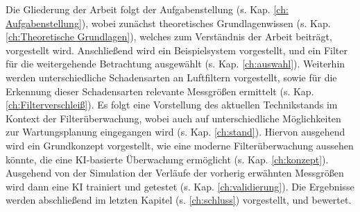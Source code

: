     Die Gliederung der Arbeit folgt der Aufgabenstellung (s. Kap. \ref{ch: Aufgabenstellung}), wobei zunächst theoretisches Grundlagenwissen (s. Kap. \ref{ch:Theoretische Grundlagen}), welches zum Verständnis der Arbeit beiträgt, vorgestellt wird. Anschließend wird ein Beispielsystem vorgestellt, und ein Filter für die weitergehende Betrachtung ausgewählt (s. Kap. \ref{ch:auswahl}). Weiterhin werden unterschiedliche Schadensarten an Luftfiltern vorgestellt, sowie für die Erkennung dieser Schadensarten relevante Messgrößen ermittelt (s. Kap. \ref{ch:Filterverschleiß}). Es folgt eine Vorstellung des aktuellen Technikstands im Kontext der Filterüberwachung, wobei auch auf unterschiedliche Möglichkeiten zur Wartungsplanung eingegangen wird (s. Kap. \ref{ch:stand}). Hiervon ausgehend wird ein Grundkonzept vorgestellt, wie eine moderne Filterüberwachung aussehen könnte, die eine KI-basierte Überwachung ermöglicht (s. Kap. \ref{ch:konzept}). Ausgehend von der Simulation der Verläufe der vorherig erwähnten Messgrößen wird dann eine KI trainiert und getestet (s. Kap. \ref{ch:validierung}). Die Ergebnisse werden abschließend im letzten Kapitel (s. \ref{ch:schluss}) vorgestellt, und bewertet.